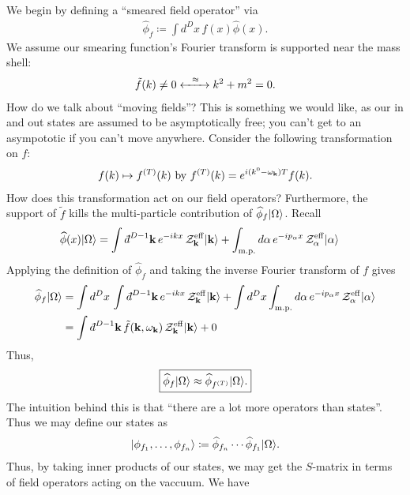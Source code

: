 \documentclass[11pt]{article}
\begin{document}
We begin by defining a ``smeared field operator'' via
\begin{align*}
    \widehat{\phi}_f \coloneqq \int d^D x \, f(x) \widehat{\phi}(x).
\end{align*}
We assume our smearing function's Fourier transform is supported 
near the mass shell:
\begin{align*}
    \tilde{f}(k) \neq 0 \xleftrightarrow{\: \: \: \: \approx \: \: \: \:} k^2 + m^2 = 0.
\end{align*}
How do we talk about ``moving fields''? This is something we
would like, as our in and out states are assumed to be asymptotically
free; you can't get to an asympototic if you can't move anywhere. 
Consider the following transformation on $f$:
\begin{align*}
    f(k) \mapsto f^{(T)}(k) \text{ by } f^{(T)}(k) = e^{i(k^0 - \omega_{\mathbf{k}})T} f(k).
\end{align*}
How does this transformation act on our field operators?
Furthermore, the support of $\tilde{f}$ kills the
multi-particle contribution of $\widehat{\phi}_{f} \lvert\Omega\rangle$.
Recall
\begin{align*}
    \widehat{\phi}(x) \ket{\Omega} & = \int \dbar^{D - 1} \bfk \, e^{-ikx}\, \mathcal{Z}^{\rm eff}_{\bfk} \ket{\bfk}
    + \int_{\rm m.p.} d\alpha \, e^{-ip_\alpha x} \, \mathcal{Z}^{\rm eff}_{\alpha} \ket{\alpha}
\end{align*}
Applying the definition of $\widehat{\phi}_f$ and taking the inverse 
Fourier transform of $f$ gives
\begin{align*}
    \widehat{\phi}_f \ket{\Omega} & = \int d^D x \, \int \dbar^{D - 1} \bfk \, e^{-ikx}\, \mathcal{Z}^{\rm eff}_{\bfk} \ket{\bfk}
    + \int d^D x \int_{\rm m.p.} d\alpha \, e^{-ip_\alpha x} \, \mathcal{Z}^{\rm eff}_{\alpha} \ket{\alpha}\\
    & = \int \dbar^{D - 1} \bfk \, \tilde{f}(\bfk, \omega_\bfk)\, \mathcal{Z}^{\rm eff}_{\bfk} \ket{\bfk} + 0
\end{align*}
Thus,
\begin{align*}
    \boxed{\widehat{\phi}_f \lvert\Omega\rangle \approx \widehat{\phi}_{f^{(T)}} \lvert\Omega\rangle.}
\end{align*}
The intuition behind this is that ``there are a lot more operators than
states''. Thus we may define our states as
\begin{align*}
    \lvert\phi_{f_1}, \ldots, \phi_{f_n}\rangle \coloneqq \widehat{\phi}_{f_n} \cdots \widehat{\phi}_{f_1} \lvert\Omega\rangle.
\end{align*}
Thus, by taking inner products of our states, we may get the $S$-matrix
in terms of field operators acting on the vaccuum. We have 
\end{document}
